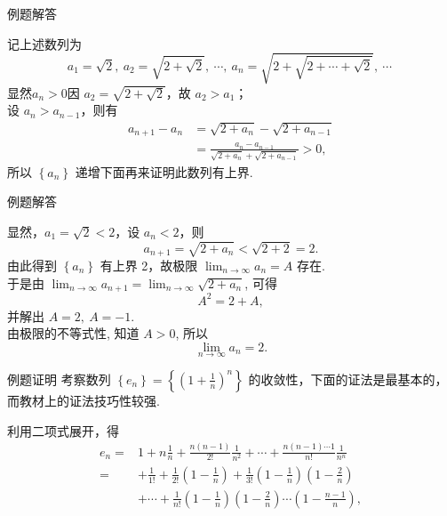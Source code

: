 \documentclass[mathserif]{beamer}
\begin{document}
\begin{frame}[label=li_2jd]{例题解答\hfill  \hyperlink{li_2<1>}{}}%
	\begin{jie}
		\suojin 记上述数列为
		$$a_{1}=\sqrt{2},\ a_{2}=\sqrt{2+\sqrt{2}},\ \cdots,\ a_{n}=\sqrt{2+\sqrt{2+\cdots+\sqrt{2}}},\ \cdots\ $$
		\suojin 显然$a_n>0$\jh 因 $a_2=\sqrt{2+\sqrt{2}}$，故 $a_2>a_1$；\\
		\suojin 设 $a_n>a_{n-1}$，则有
		$$
		\begin{aligned}
			a_{n+1}-a_n & =\sqrt{2+a_n}-\sqrt{2+a_{n-1}} \\
			& =\frac{a_n-a_{n-1}}{\sqrt{2+a_n}+\sqrt{2+a_{n-1}}}>0,
		\end{aligned}
		$$
		所以 $\left\{a_n\right\}$ 递增\jh 下面再来证明此数列有上界.
	\end{jie}
\end{frame}




\begin{frame}{例题解答\hfill  \hyperlink{li_2<1>}{}}%
	\begin{proofs}
		\suojin 显然，$a_1=\sqrt{2}<2$，设 $a_n<2$，则
		$$
		a_{n+1}=\sqrt{2+a_n}<\sqrt{2+2}=2 .
		$$
		由此得到 $\left\{a_n\right\}$ 有上界 2，故极限 $\lim _{n \rightarrow \infty} a_n=A$ 存在.\\ \xiaojg
	\suojin 于是由 $\lim _{n \rightarrow \infty} a_{n+1}=\lim _{n \rightarrow \infty} \sqrt{2+a_n}$, 可得
	$$A^2=2+A,$$ 
	并解出 $A=2,\ A=-1$.\\
	\suojin 由极限的不等式性, 知道 $A>0$, 所以
	$$
	\lim _{n \rightarrow \infty} a_n=2.
	$$  
    \end{proofs}
\end{frame}





\begin{frame}[label=li_4jd]{例题证明\hfill\hyperlink{li_4<1>}{}}%
	\suojin 考察数列 $\left\{e_n\right\}=\left\{\left(1+\frac{1}{n}\right)^n\right\}$ 的收敛性，下面的证法是最基本的，而教材上的证法技巧性较强.
	\begin{proofs}
		\suojin 利用二项式展开，得
		{\xiaowuhao
			$$
			\begin{aligned}
				e_n= & 1+n \frac{1}{n}+\frac{n(n-1)}{2 !} \frac{1}{n^2}+\cdots+\frac{n(n-1) \cdots 1}{n !} \frac{1}{n^n} \\
				= & +\frac{1}{1 !}+\frac{1}{2 !}\left(1-\frac{1}{n}\right)+\frac{1}{3 !}\left(1-\frac{1}{n}\right)\left(1-\frac{2}{n}\right) \\
				& +\cdots+\frac{1}{n !}\left(1-\frac{1}{n}\right)\left(1-\frac{2}{n}\right) \cdots\left(1-\frac{n-1}{n}\right),
			\end{aligned}
			$$}
	\end{proofs}
\end{frame}
\end{document}
